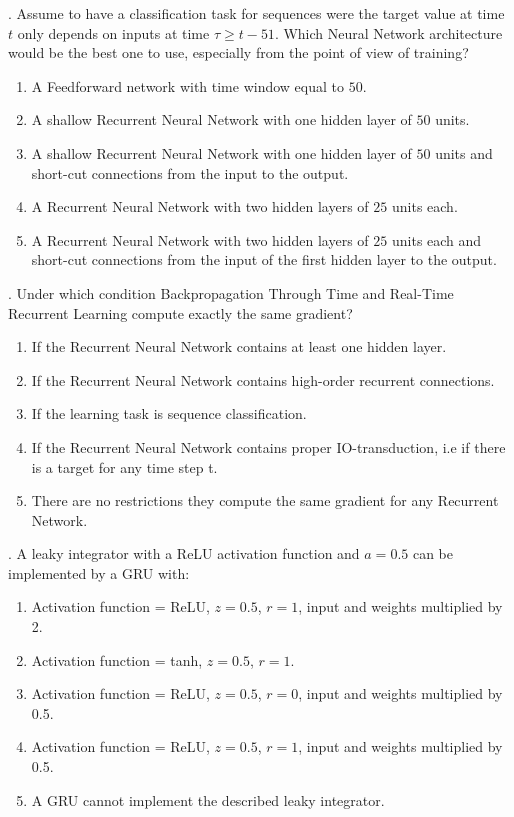 . Assume to have a classification task for sequences were the target value at time $t$ only depends on inputs at time $\tau \geq t - 51$. Which Neural Network architecture would be the best one to use, especially from the point of view of training?

\begin{enumerate}
    \item A Feedforward network with time window equal to $50$.
    \item A shallow Recurrent Neural Network with one hidden layer of $50$ units.
    \item A shallow Recurrent Neural Network with one hidden layer of $50$ units and short-cut connections from the input to the output.
    \item A Recurrent Neural Network with two hidden layers of $25$ units each.
    \item A Recurrent Neural Network with two hidden layers of $25$ units each and short-cut connections from the input of the first hidden layer to the output.
    
\end{enumerate}

. Under which condition Backpropagation Through Time and Real-Time Recurrent Learning compute exactly the same gradient?
\begin{enumerate}[label=\roman*]
    \item If the Recurrent Neural Network contains at least one hidden layer.
    \item If the Recurrent Neural Network contains high-order recurrent connections.
    \item If the learning task is sequence classification.
    \item If the Recurrent Neural Network contains proper IO-transduction, i.e if there is a target for any time step t.
    \item There are no restrictions they compute the same gradient for any Recurrent Network.
\end{enumerate}


. A leaky integrator with a ReLU activation function and $a=0.5$ can be implemented by a GRU with:

\begin{enumerate}[label=\roman*]
    \item Activation function = ReLU, $z=0.5$, $r=1$, input and weights multiplied by 2.
    \item Activation function = tanh, $z=0.5$, $r=1$.
    \item Activation function = ReLU, $z=0.5$, $r=0$, input and weights multiplied by 0.5.
    \item Activation function = ReLU, $z=0.5$, $r=1$, input and weights multiplied by 0.5.
    \item A GRU cannot implement the described leaky integrator.
\end{enumerate}

